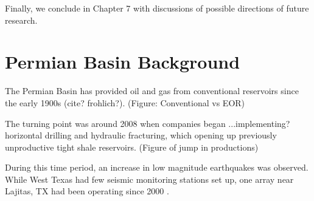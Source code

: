 \documentclass{utexasthesis}
\begin{document}
Finally, we conclude in Chapter 7 with discussions of possible directions of future research.




%
%
%
%
%
%
%
%



\chapter{Permian Basin Background}
\label{CHAP:2}

%

The Permian Basin has provided oil and gas from conventional reservoirs since the early 1900s (cite? frohlich?).
(Figure: Conventional vs EOR)

The turning point was around 2008 when companies began ...implementing? horizontal drilling and hydraulic fracturing, which opening up previously unproductive tight shale reservoirs.
(Figure of jump in productions)



During this time period, an increase in low magnitude earthquakes was observed. While West Texas had few seismic monitoring stations set up, one array near Lajitas, TX had been operating since 2000 \cite{Frohlich2019OnsetCauseIncreased}.
\end{document}
